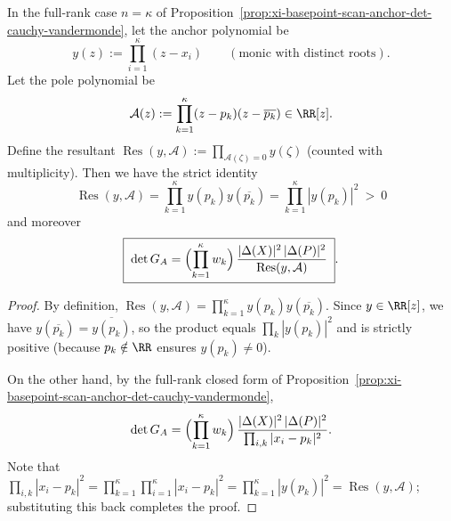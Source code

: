 \begin{corollary}\label{cor:xi-basepoint-scan-anchor-det-resultant}
In the full-rank case \(n=\kappa\) of Proposition~\ref{prop:xi-basepoint-scan-anchor-det-cauchy-vandermonde}, let the anchor polynomial be
\[
y(z):=\prod_{i=1}^{\kappa}(z-x_i)
\qquad(\text{monic with distinct roots}).
\]
Let the pole polynomial be
\[
\mathcal{A}(z):=\prod_{k=1}^{\kappa}(z-p_k)(z-\overline{p_k})\in\RR[z].
\]
Define the resultant
\(
\operatorname{Res}(y,\mathcal{A}):=\prod_{\mathcal{A}(\zeta)=0}y(\zeta)
\)
(counted with multiplicity).
Then we have the strict identity
\[
\boxed{\;
\operatorname{Res}(y,\mathcal{A})
=\prod_{k=1}^{\kappa}y(p_k)y(\overline{p_k})
=\prod_{k=1}^{\kappa}|y(p_k)|^{2}\ >\ 0\;}
\]
and moreover
\[
\boxed{\;
\det G_A
=\Bigl(\prod_{k=1}^{\kappa}w_k\Bigr)\,
\frac{|\Delta(X)|^2\,|\Delta(P)|^2}{\operatorname{Res}(y,\mathcal{A})}\; }.
\]
\end{corollary}
\begin{proof}
By definition,
\(
\operatorname{Res}(y,\mathcal{A})
=\prod_{k=1}^{\kappa}y(p_k)y(\overline{p_k})
\).
Since \(y\in\RR[z]\), we have \(y(\overline{p_k})=\overline{y(p_k)}\), so the product equals \(\prod_k|y(p_k)|^2\) and is strictly positive (because \(p_k\notin\RR\) ensures \(y(p_k)\ne 0\)).
\par
On the other hand, by the full-rank closed form of Proposition~\ref{prop:xi-basepoint-scan-anchor-det-cauchy-vandermonde},
\[
\det G_A=\Bigl(\prod_{k=1}^{\kappa}w_k\Bigr)\,
\frac{|\Delta(X)|^2\,|\Delta(P)|^2}{\prod_{i,k}|x_i-p_k|^2}.
\]
Note that
\(
\prod_{i,k}|x_i-p_k|^2
=\prod_{k=1}^{\kappa}\prod_{i=1}^{\kappa}|x_i-p_k|^2
=\prod_{k=1}^{\kappa}|y(p_k)|^2
=\operatorname{Res}(y,\mathcal{A})
\); substituting this back completes the proof.
\end{proof}


